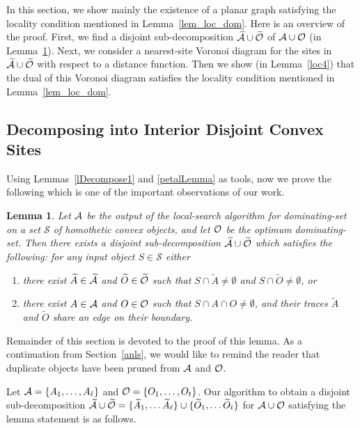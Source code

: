 \documentclass[a4paper,11pt]{article}
\newtheorem{lemma}{Lemma}
\begin{document}
In this section, we show mainly the existence of a planar graph 
satisfying the locality condition mentioned in Lemma~\ref{lem_loc_dom}.  Here is an overview of the proof.
First, we  find a disjoint sub-decomposition $\widetilde{\cal A}\cup \widetilde{\cal O}$ of ${\cal A}\cup {\cal O}$ (in Lemma~\ref{lDecompose2}).
Next, we  consider a nearest-site Voronoi diagram for the sites in $\widetilde{\cal A}\cup \widetilde{\cal O}$ with respect to a distance function.
Then we show (in Lemma~\ref{loc4}) that the dual of this  Voronoi diagram satisfies the locality condition mentioned in Lemma~\ref{lem_loc_dom}.  

\subsection{Decomposing into Interior Disjoint  Convex Sites}\label{SDecompose2}
Using  Lemmas~\ref{lDecompose1} and \ref{petalLemma} as tools, now we prove the following which is one of  the 
important observations of our work.

\begin{lemma}\label{lDecompose2}
Let  ${\cal A}$ be the output of the local-search algorithm for dominating-set on a set $\mathscr{S}$ of homothetic convex objects, and let   ${\cal O}$ be the optimum dominating-set. 
Then there exists
a disjoint sub-decomposition  $\widetilde{\cal A}\cup \widetilde{\cal O}$ which 
satisfies the following:
for any input  object $S\in \mathscr{S}$  
either
\begin{enumerate}[label=(\roman*)]
 \item  there exist  $\widetilde{A}\in \widetilde{\cal A}$ and 
$\widetilde{O}\in\widetilde{\cal O}$ such that  $S\cap \widetilde{A}\neq 
\emptyset$ and  $S\cap \widetilde{O}\neq \emptyset$, or
\item there exist 
 ${A}\in {\cal A}$ and 
${O}\in{\cal O}$ such that  $S\cap {A} \cap {O}\neq \emptyset$, and their traces
$\widetilde{A}$ and $\widetilde{O}$  share an edge  on their boundary.
\end{enumerate}
\end{lemma}
Remainder of this section is devoted to the proof of this lemma. As a continuation  from Section~\ref{anls}, we would like to remind the reader that  duplicate objects have been pruned from ${\cal A}$ and ${\cal O}$.
   
Let ${\cal A}=\{A_1,\ldots,A_{\ell}\}$  and ${\cal O}=\{O_1,\ldots,O_t\}$.
Our algorithm to obtain a disjoint
sub-decomposition  $\widetilde{\cal A}\cup \widetilde{\cal 
O}=\{\widetilde{A}_1,\ldots 
\widetilde{A}_{\ell}\}\cup\{\widetilde{O}_1,\ldots \widetilde{O}_{t}\}$ for 
${\cal A}\cup {\cal O}$ satisfying the lemma statement is  as follows. 
\end{document}
